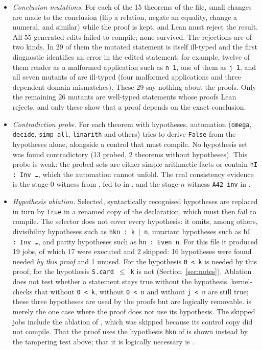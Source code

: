 \documentclass[11pt]{article}
\theoremstyle{definition}
\theoremstyle{remark}
\newcommand{\lean}[1]{\texttt{#1}}
\begin{document}
\begin{itemize}
\item \emph{Conclusion mutations.} For each of the 15 theorems of the file, small changes are made
to the conclusion (flip a relation, negate an equality, change a numeral, and similar) while the
proof is kept, and Lean must reject the result. All 55 generated edits failed to compile; none
survived. The rejections are of two kinds. In 29 of them the mutated statement is itself ill-typed
and the first diagnostic identifies an error in the edited statement: for example, twelve of them
render as a malformed application such as \lean{n 1}, one of them as \lean{j 1}, and all seven
mutants of  are ill-typed (four malformed applications and three
dependent-domain mismatches). These 29 say nothing about the proofs. Only the
remaining 26 mutants are well-typed statements whose proofs Lean rejects, and only these show
that a proof depends on the exact conclusion.
\item \emph{Contradiction probe.} For each theorem with hypotheses, automation (\lean{omega},
\lean{decide}, \lean{simp\_all}, \lean{linarith} and others) tries to derive \lean{False} from the
hypotheses alone, alongside a control that must compile. No hypothesis set was found
contradictory (13 probed, 2 theorems without hypotheses). This probe is weak: the probed sets
are either simple arithmetic facts or contain \lean{hI : Inv \dots}, which the automation cannot
unfold. The real consistency evidence is the stage-$0$ witness from , fed to
 in , and the stage-$n$ witness \lean{A42\_inv} in
.
\item \emph{Hypothesis ablation.} Selected, syntactically recognised hypotheses are replaced in
turn by \lean{True} in a renamed copy of the declaration, which must then fail to compile. The
selector does not cover every hypothesis: it omits, among others, divisibility hypotheses such as
\lean{hkn : k }$\mid$\lean{ n}, invariant hypotheses such as \lean{hI : Inv \dots}, and parity
hypotheses such as \lean{hn : Even n}. For this file it produced 19 jobs, of which 17 were
executed and 2 skipped: 16 hypotheses were found needed \emph{by this proof} and 1 unused. For
 the hypothesis \lean{0 < k} is needed by this proof; for 
the hypothesis \lean{S.card }$\le$\lean{ k} is not (Section~\ref{sec:notes}). Ablation does not test
whether a statement stays true without the hypothesis.  kernel-checks
that  without \lean{0 < k},  without \lean{0 < n} and
 without \lean{j < n} are still true; these three hypotheses are used by
the proofs but are logically removable.  is merely the one case where the
proof does not use its hypothesis. The skipped jobs include the
ablation of , which was skipped because its control copy did not compile. That
the proof uses the hypothesis \lean{hkn} of  is shown instead by the tampering test
above; that it is logically necessary is .
\end{itemize}
\end{document}
